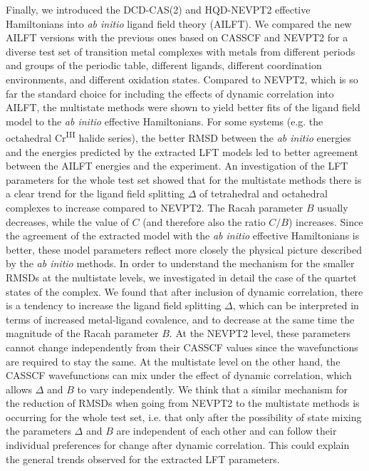 Finally, we introduced the DCD-CAS(2) and HQD-NEVPT2 effective Hamiltonians into \textit{ab initio} ligand field theory (AILFT).
We compared the new AILFT versions with the previous ones based on CASSCF and NEVPT2 for a diverse test set of transition metal complexes with metals from different periods and groups of the periodic table, different ligands, different coordination environments, and different oxidation states. Compared to NEVPT2, which is so far the standard choice for including the effects of dynamic correlation into AILFT, the multistate methods were shown to yield better fits of the ligand field model to the \textit{ab initio} effective Hamiltonians. For some systems (e.g. the octahedral Cr\textsuperscript{III} halide series), the better RMSD between the \textit{ab initio} energies and the energies predicted by the extracted LFT models led to better agreement between the AILFT energies and the experiment. 
An investigation of the LFT parameters for the whole test set showed that for the
multistate methods there is a clear trend for the ligand field splitting $\Delta$ of tetrahedral
and octahedral complexes to increase compared to NEVPT2. The Racah parameter $B$
usually decreases, while the value of $C$ (and therefore also the ratio $C/B$) increases. Since the agreement of the extracted model with the \textit{ab initio} effective Hamiltonians is better, these model parameters reflect more closely the
physical picture described by the \textit{ab initio} methods.
In order to understand the mechanism for the smaller RMSDs at the multistate levels, we
investigated in detail the case of the quartet states of the \CrF complex. We found that
after inclusion of dynamic correlation, there is a tendency to increase the ligand field
splitting $\Delta$, which can be interpreted in terms of increased metal-ligand covalence, and
to decrease at the same time the magnitude of the Racah parameter $B$. At the NEVPT2
level, these parameters cannot change independently from their CASSCF values since the
wavefunctions are required to stay the same. At the multistate level on the other hand,
the CASSCF wavefunctions can mix under the effect of dynamic correlation, which allows $\Delta$ and $B$ to vary independently. We think that a similar mechanism for the reduction of
RMSDs when going from NEVPT2 to the multistate methods is occurring for the whole
test set, i.e. that only after the possibility of state mixing the parameters $\Delta$ and $B$ are
independent of each other and can follow their individual preferences for change after
dynamic correlation. This could explain the general trends observed for the extracted LFT
parameters.

